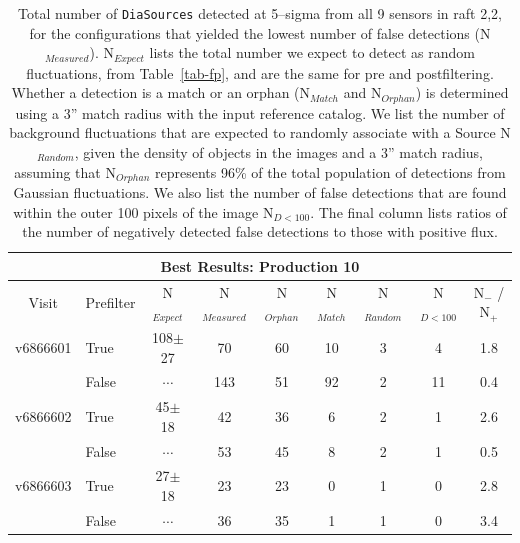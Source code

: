 \documentclass[prd, nofootinbib, floatfix, 11pt,tightenlines,times]{article}
\begin{document}
\begin{table}
\centering
\begin{tabular}{clc|cccccc}
\hline
\multicolumn{9}{|c|}{Best Results: Production 10} \\
\hline
Visit    & Prefilter & N$_{Expect}$ & N$_{Measured}$ &  N$_{Orphan}$ & N$_{Match}$ & N$_{Random}$ & N$_{D<100}$ & N$_{-}$ / N$_{+}$ \\
\hline
v6866601 & True      & 108$\pm$27   & 70      &60         & 10 & 3     & 4   & 1.8 \\ 
         & False     & $\cdots$     & 143     &51         & 92 & 2     & 11  & 0.4 \\
v6866602 & True      & 45$\pm$18    & 42      &36         & 6  & 2     & 1   & 2.6 \\
         & False     & $\cdots$     & 53      &45         & 8  & 2     & 1   & 0.5 \\
v6866603 & True      & 27$\pm$18    & 23      &23         & 0  & 1     & 0   & 2.8 \\
         & False     & $\cdots$     & 36      &35         & 1  & 1     & 0   & 3.4 \\
\end{tabular}
\caption{Total number of {\tt DiaSources} detected at 5--sigma from
  all 9 sensors in raft 2,2, for the configurations that yielded the
  lowest number of false detections (N$_{Measured}$).  N$_{Expect}$
  lists the total number we expect to detect as random fluctuations,
  from Table~\ref{tab-fp}, and are the same for pre and postfiltering.
  Whether a detection is a match or an orphan (N$_{Match}$ and
  N$_{Orphan}$) is determined using a 3'' match radius with the input
  reference catalog.  We list the number of background fluctuations
  that are expected to randomly associate with a Source N$_{Random}$,
  given the density of objects in the images and a 3'' match radius,
  assuming that N$_{Orphan}$ represents 96\% of the total population
  of detections from Gaussian fluctuations.  We also list the number
  of false detections that are found within the outer 100 pixels of
  the image N$_{D<100}$.  The final column lists ratios of the number
  of negatively detected false detections to those with positive
  flux. \label{tab-bestfp10}}
\end{table}
\end{document}
